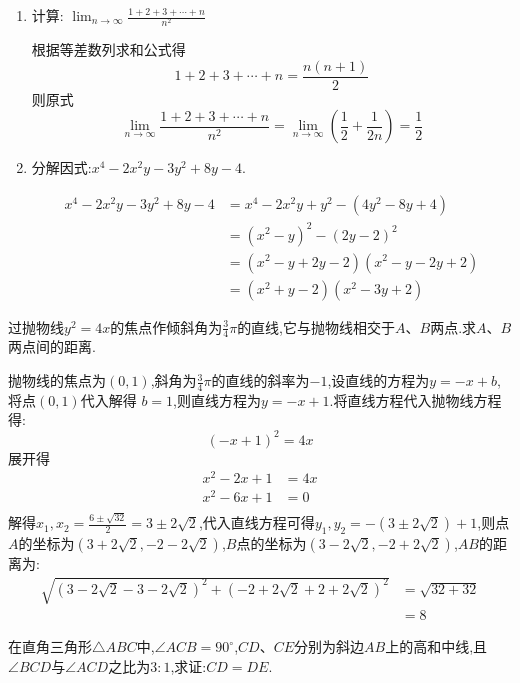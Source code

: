\begin{questions}
\begin{enumerate}[label=(\arabic*)]
		\item 计算: \( \displaystyle \lim_{n\to\infty}\frac{1+2+3+\cdots+n}{n^2} \)
		      \begin{solution}
			      根据等差数列求和公式得
			      \begin{equation*}
				      1 + 2 + 3 + \cdots + n = \frac{n(n+1)}{2}
			      \end{equation*}
			      则原式
			      \begin{equation*}
				      \lim_{n\to\infty}\frac{1+2+3+\cdots+n}{n^2} = \lim_{n\to\infty}(\frac12 + \frac{1}{2n}) = \frac12
			      \end{equation*}
		      \end{solution}
		\item 分解因式:$ x^4 - 2x^2y - 3y^2 + 8y - 4 $.
		      \begin{solution}
			      \begin{align*}
				      x^4 - 2x^2y - 3y^2 + 8y - 4 & = x^4 - 2x^2y + y^2 - (4y^2 - 8y + 4)  \\
				                                  & = (x^2 - y)^2 - (2y - 2)^2             \\
				                                  & = (x^2 - y + 2y - 2)(x^2 - y - 2y + 2) \\
				                                  & = (x^2 + y - 2)(x^2 - 3y + 2)
			      \end{align*}
		      \end{solution}
	\end{enumerate}
	\question 过抛物线$ y^2 = 4x
	$的焦点作倾斜角为$\frac34\pi$的直线,它与抛物线相交于$A$、$B$两点.求$A$、$B$两点间的距离.
	\begin{solution}
		抛物线的焦点为$(0,1)$,斜角为$\frac34\pi$的直线的斜率为$-1$,设直线的方程为$ y = -x + b $,将点$(0,1)$代入解得
		$b = 1$,则直线方程为$ y=-x+1 $.将直线方程代入抛物线方程得:
		\begin{equation*}
			(-x + 1)^2 = 4x
		\end{equation*}
		展开得
		\begin{align*}
			x^2 - 2x + 1 & = 4x \\
			x^2 -6x + 1  & = 0  \\
		\end{align*}
		解得$ x_1,x_2 = \frac{6 \pm \sqrt{32}}{2} = 3 \pm 2\sqrt{2} $,代入直线方程可得$ y_1,y_2 = -(3\pm2\sqrt{2}) +
			1$,则点$A$的坐标为$(3+2\sqrt{2}, -2 - 2\sqrt{2})$,$B$点的坐标为$(3-2\sqrt{2}, -2 + 2\sqrt{2})$,$AB$的距离为:
		\begin{align*}
			\sqrt{(3-2\sqrt{2} - 3 - 2\sqrt{2})^2 + (-2 + 2\sqrt{2} + 2 + 2\sqrt{2})^2}
			 & = \sqrt{32 + 32} \\
			 & = 8
		\end{align*}
	\end{solution}
	\question 在直角三角形$ \triangle{ABC} $中,$ \angle{ACB} = 90^\circ
	$,$CD$、$CE$分别为斜边$AB$上的高和中线,且$\angle{BCD}$与$\angle{ACD}$之比为$3:1$,求证:$CD=DE$.


\end{questions}
